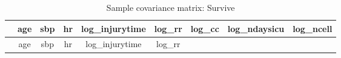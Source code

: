 \documentclass[
]{article}
\begin{document}
\begin{longtable}[]{@{}lcccccccc@{}}
\caption{Sample covariance matrix: Survive}\tabularnewline
\toprule
\begin{minipage}[b]{0.09\columnwidth}\raggedright
\strut
\end{minipage} & \begin{minipage}[b]{0.08\columnwidth}\centering
age\strut
\end{minipage} & \begin{minipage}[b]{0.09\columnwidth}\centering
sbp\strut
\end{minipage} & \begin{minipage}[b]{0.09\columnwidth}\centering
hr\strut
\end{minipage} & \begin{minipage}[b]{0.10\columnwidth}\centering
log\_injurytime\strut
\end{minipage} & \begin{minipage}[b]{0.07\columnwidth}\centering
log\_rr\strut
\end{minipage} & \begin{minipage}[b]{0.07\columnwidth}\centering
log\_cc\strut
\end{minipage} & \begin{minipage}[b]{0.09\columnwidth}\centering
log\_ndaysicu\strut
\end{minipage} & \begin{minipage}[b]{0.07\columnwidth}\centering
log\_ncell\strut
\end{minipage}\tabularnewline
\midrule
\endfirsthead
\toprule
\begin{minipage}[b]{0.09\columnwidth}\raggedright
\strut
\end{minipage} & \begin{minipage}[b]{0.08\columnwidth}\centering
age\strut
\end{minipage} & \begin{minipage}[b]{0.09\columnwidth}\centering
sbp\strut
\end{minipage} & \begin{minipage}[b]{0.09\columnwidth}\centering
hr\strut
\end{minipage} & \begin{minipage}[b]{0.10\columnwidth}\centering
log\_injurytime\strut
\end{minipage} & \begin{minipage}[b]{0.07\columnwidth}\centering
log\_rr\strut
\end{minipage} & \begin{minipage}[b]{0.07\columnwidth}\centering

\end{minipage}
\end{longtable}
\end{document}
